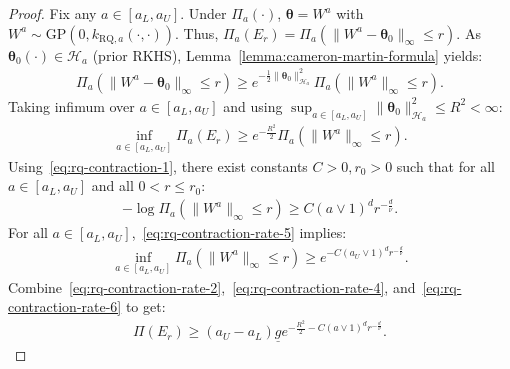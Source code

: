 \documentclass[final,12pt]{colt2026} %
\begin{document}
\begin{proof}
Fix any $a\in [a_L, a_U]$. Under $\Pi_a(\cdot)$, $\pmb\theta = W^{a}$ with $W^{a} \sim \mathrm{GP}(0, k_{\mathrm{RQ}, a}(\cdot, \cdot))$. Thus, $\Pi_a(E_r) = \Pi_a(\lVert W^{a} - \pmb\theta_0\rVert_{\infty} \leq r)$. As $\pmb\theta_0(\cdot) \in \mathcal{H}_a$ (prior RKHS), Lemma~\ref{lemma:cameron-martin-formula} yields:
\begin{align}
\label{eq:rq-contraction-rate}
\Pi_a\left(\lVert W^{a} - \pmb\theta_0\rVert_{\infty} \leq r\right) \geq e^{-\frac{1}{2}\lVert \pmb\theta_0\rVert^{2}_{\mathcal{H}_a}}\Pi_a\left(\lVert W^{a}\rVert_{\infty} \leq r\right).
\end{align}
Taking infimum over $a\in [a_L, a_U]$ and using $\sup_{a\in [a_L, a_U]}\lVert \pmb\theta_0\rVert^{2}_{\mathcal{H}_a} \leq R^{2} < \infty$:
\begin{align}
\label{eq:rq-contraction-rate-4}
\inf_{a\in [a_L, a_U]}\Pi_{a}(E_r) \geq e^{-\frac{R^2}{2}}\Pi_{a}\left(\lVert W^{a}\rVert_{\infty} \leq r\right).
\end{align}
Using~\eqref{eq:rq-contraction-1}, there exist constants $C>0, r_0>0$ such that for all $a\in [a_L,a_U]$ and all $0<r\leq r_0$:
\begin{align}
\label{eq:rq-contraction-rate-5}
-\log \Pi_a\left(\lVert W^a\rVert_{\infty} \leq r\right) \geq C(a\vee 1)^{d}r^{-\frac{d}{\nu}}.
\end{align}
For all $a\in [a_L, a_U]$,~\eqref{eq:rq-contraction-rate-5} implies:
\begin{align}
\label{eq:rq-contraction-rate-6}
\inf_{a\in [a_L, a_U]}\Pi_a\left(\lVert W^{a}\rVert_{\infty} \leq r\right) \geq e^{-C(a_U\vee 1)^d r^{-\frac{d}{\nu}}}.
\end{align}
Combine~\eqref{eq:rq-contraction-rate-2},~\eqref{eq:rq-contraction-rate-4}, and~\eqref{eq:rq-contraction-rate-6} to get:
\begin{align}
\label{eq:rq-contraction-rate-7}
\Pi(E_r) \geq (a_U-a_L) \underline{g}e^{-\frac{R^2}{2} - C(a\vee 1)^{d}r^{-\frac{d}{\nu}}}.
\end{align}


\end{proof}
\end{document}
